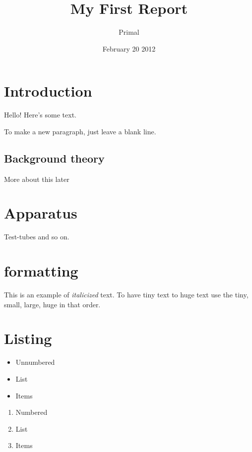 \documentclass{article} %
\title{My First Report}
\author{Primal}
\date{February 20 2012}
\begin{document}
\maketitle %
\tableofcontents %
\section{Introduction}
Hello!  Here's some text.

To make a new paragraph, just leave a blank line.

\subsection{Background theory}
More about this later

\section{Apparatus}
Test-tubes and so on.

\section{formatting}
This is an example of \textit{italicized} text. To have 
tiny {\tiny text} to huge {\huge text} use the tiny, small, large,
huge in that order.

\section{Listing}

\begin{itemize}
\item Unnumbered
\item List 
\item Items
\end{itemize}

\begin{enumerate}
\item Numbered
\item List 
\item Items
\end{enumerate}
\end{document}
